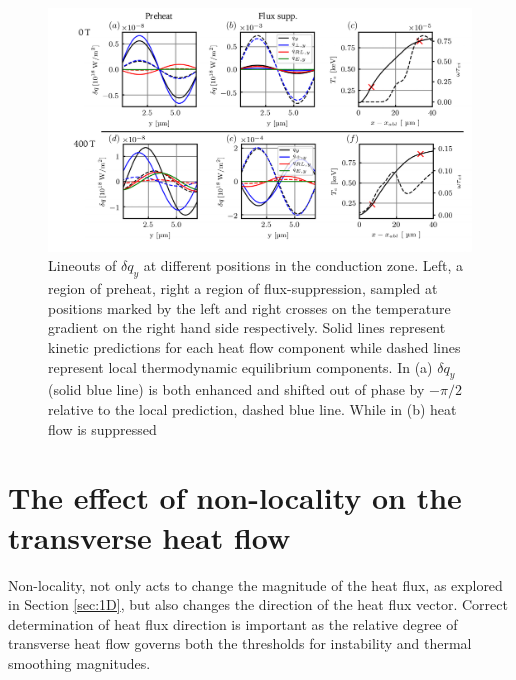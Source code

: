 \documentclass[aip,reprint]{revtex4-1}
\begin{document}
\begin{figure}
		\includegraphics[width=1.0\textwidth]{pics/dqy_LT2_0T_400T_2.pdf}
	\caption{\label{fig:heatflow_phase_shift} Lineouts of $\delta q_{y}$ at different positions in the conduction zone. Left, a region of preheat, right a region of flux-suppression, sampled at positions marked by the left and right crosses on the temperature gradient on the right hand side respectively. Solid lines represent kinetic predictions for each heat flow component while dashed lines represent local thermodynamic equilibrium components. In (a) $\delta q_{y}$ (solid blue line) is both enhanced and shifted out of phase by $-\pi/2$ relative to the local prediction, dashed blue line. While in (b) heat flow is suppressed }
\end{figure}

\section{The effect of non-locality on the transverse heat flow}
\label{sec:non-locality-2D}

Non-locality, not only acts to change the magnitude of the heat flux, as explored in Section \ref{sec:1D}, but also changes the direction of the heat flux vector. Correct determination of heat flux direction is important as the relative degree of transverse heat flow governs both the thresholds for instability and thermal smoothing magnitudes. 
\end{document}
